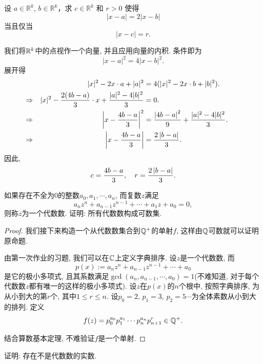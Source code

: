 \documentclass{article}
\begin{document}
\begin{problem}[1-19]
设 \(a \in \mathbb{R}^k\), \(b \in \mathbb{R}^k\)，求 \(c \in \mathbb{R}^k\) 和 \(r > 0\) 使得
\[
|x - a| = 2|x - b|
\]
当且仅当
\[
|x - c| = r.
\]
\end{problem}

\begin{solution}
我们将$ \mathbb{R}^k $中的点视作一个向量, 并且应用向量的内积. 条件即为
\[
|x - a|^2 = 4|x - b|^2.
\]
展开得
\begin{align*}
& &|x|^2 - 2x\cdot a + |a|^2 &= 4(|x|^2 - 2x\cdot b + |b|^2).&&&&\\
&\Rightarrow&|x|^2 - \frac{2(4b - a)}{3}\cdot x + \frac{|a|^2 - 4|b|^2}{3} &= 0.&&&&\\
&\Rightarrow&\left|x - \frac{4b - a}{3}\right|^2 &= \frac{\left|4b-a\right|^2}{9} + \frac{|a|^2 - 4|b|^2}{3}.&&&&\\
&\Rightarrow&\left|x - \frac{4b - a}{3}\right| &= \frac{2\left|b-a\right|}{3}.&&&&\\
\end{align*}
因此, 
\[ c=\frac{4b-a}{3},\quad r=\frac{2\left|b-a\right|}{3}. \] 
\end{solution}

\begin{problem}[2-2]
    如果存在不全为\( 0 \)的整数\( a_0,a_1,\cdots,a_n \), 而复数\( z \)满足
    \[ a_nz^n+a_{n-1}z^{n-1}+\cdots+a_1z+a_0=0, \] 
    则称\( z \)为一个{\heiti 代数数}. 证明: 所有代数数构成可数集.
\end{problem}

\begin{proof}
    我们接下来构造一个从代数数集合到\( \mathbb{Q}^+ \)的单射\( f \), 这样由\( \mathbb{Q}  \)可数就可以证明原命题.\par
    由第一次作业的习题, 我们可以在\( \mathbb{C} \)上定义字典排序. 设\( z \)是一个代数数, 而
    \[ p(x):=a_nz^n+a_{n-1}z^{n-1}+\cdots+a_0 \] 
    是它的极小多项式, 且其系数满足\( \gcd(a_n,a_{n-1},\cdots,a_0)=1 \)(不难知道, 对于每个代数数\( z \)都有唯一的这样的极小多项式). 设\( z \)在\( p(x) \)的\( n \)个根中, 按照字典排序, 为从小到大的第\( r \)个, 其中\( 1\le r\le n \). 设\( p_0=2,\,p_1=3,\,p_2=5\cdots \)为全体素数从小到大的排列. 定义
    \[ f(z)=p_0^{a_0}p_1^{a_1}\cdots p_n^{a_n}p_{n+1}^r\in\mathbb{Q}^+ . \]\par
    结合算数基本定理, 不难验证\( f \)是一个单射. 
\end{proof}

\begin{problem}[2-3]
    证明: 存在不是代数数的实数.
\end{problem}
\end{document}
